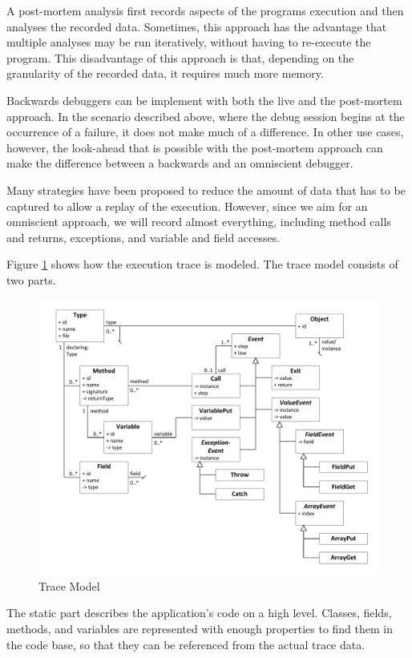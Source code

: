 \documentclass[english]{scrartcl}
\begin{document}
A post-mortem analysis first records aspects of the programs execution and then analyses the recorded data.
Sometimes, this approach has the advantage that multiple analyses may be run iteratively, without having to re-execute the program.
This disadvantage of this approach is that, depending on the granularity of the recorded data, it requires much more memory.

Backwards debuggers can be implement with both the live and the post-mortem approach.
In the scenario described above, where the debug session begins at the occurrence of a failure, it does not make much of a difference.
In other use cases, however, the look-ahead that is possible with the post-mortem approach can make the difference between a backwards and an omniscient debugger.

Many strategies have been proposed to reduce the amount of data that has to be captured to allow a replay of the execution.
However, since we aim for an omniscient approach, we will record almost everything, including method calls and returns, exceptions, and variable and field accesses.

Figure \ref{fig:model} shows how the execution trace is modeled.
The trace model consists of two parts.


\begin{figure}[t]
\centering
\includegraphics[width=.7\textwidth, clip, trim=5mm 5mm 5mm 5mm]{img/model.pdf}
\caption{Trace Model}
\label{fig:model}
\end{figure}


The static part describes the application's code on a high level.
Classes, fields, methods, and variables are represented with enough properties to find them in the code base, so that they can be referenced from the actual trace data.
\end{document}
